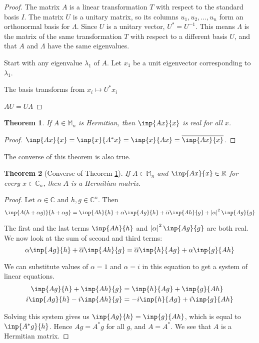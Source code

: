 \documentclass[twofold]{article}
\newcommand*\conj[1]{\overline{#1}}
\newcommand*\adj[1]{#1^*}
\newcommand*\abs[1]{\left \vert #1 \right\vert}
\theoremstyle{plain}
\newtheorem{theorem}{Theorem}
\theoremstyle{definition}
\theoremstyle{remark}
\begin{document}
\begin{proof} 
The matrix \(A\) is a linear transformation \(T\) with respect to the standard basis \(I\). The matrix \(U\) is a unitary matrix, so its columns \(u_1, u_2, \ldots , u_n\) form an orthonormal basis for \(\Lambda\). Since \(U\) is a unitary vector, \(\adj{U} = U^{-1}\). This means \(\Lambda\) is the matrix of the same transformation \(T\) with respect to a different basis \(U\), and that \(A\) and \(\Lambda\) have the same eigenvalues.


Start with any eigenvalue \(\lambda_1\) of \(A\). Let \(x_1\) be a unit eigenvector corresponding to \(\lambda_1\).

The basis transforms from \(x_i \mapsto \adj{U}x_i\)

\(AU = U\Lambda\)

\end{proof}

\begin{theorem} \label{hermit_real} If \(A \in \mathbb{M}_n\) is Hermitian, then \(\inp{Ax}{x}\) is real for all \(x\). \end{theorem}
\begin{proof} \(\inp{Ax}{x} = \inp{x}{\adj{A}x} = \inp{x}{Ax} = \conj{\inp{Ax}{x}}\). \end{proof}

The converse of this theorem is also true.

\begin{theorem}[Converse of Theorem \ref{hermit_real}]\label{eig_real_herm} If \(A \in \mathbb{M}_n\) and \(\inp{Ax}{x} \in \mathbb{R}\) for every \(x \in \mathbb{C}_n\), then \(A\) is a Hermitian matrix. \end{theorem}

\begin{proof} Let \(\alpha \in \mathbb{C}\) and \(h, g \in \mathbb{C}^n\). Then
\[\inp{A(h + \alpha g)}{h + \alpha g} = \inp{Ah}{h} + \alpha \inp{Ag}{h} + \conj{\alpha} \inp{Ah}{g} + \abs{\alpha}^2 \inp{Ag}{g} \]

The first and the last terms \(\inp{Ah}{h}\) and \(\abs{\alpha}^2 \inp{Ag}{g}\) are both real. We now look at the sum of second and third terms:
\[\alpha \inp{Ag}{h} + \conj{\alpha} \inp{Ah}{g} = \conj{\alpha} \inp{h}{Ag} + \alpha \inp{g}{Ah} \]

We can substitute values of \(\alpha = 1\) and \(\alpha = i\)  in this equation to get a system of linear equations. 
\begin{equation*}
\begin{aligned}
\inp{Ag}{h}  + \inp{Ah}{g} & =  \inp{h}{Ag}  + \inp{g}{Ah} \\
i \inp{Ag}{h}  - i \inp{Ah}{g}  & = -i \inp{h}{Ag} +  i \inp{g}{Ah} 
\end{aligned}
\end{equation*}

Solving this system gives us \(\inp{Ag}{h} = \inp{g}{Ah}\), which is equal to \(\inp{\adj{A}g}{h}\). Hence \(Ag = \adj{A}g\) for all \(g\), and \(A = \adj{A}\). We see that \(A\) is a Hermitian matrix.
\end{proof}
\end{document}

